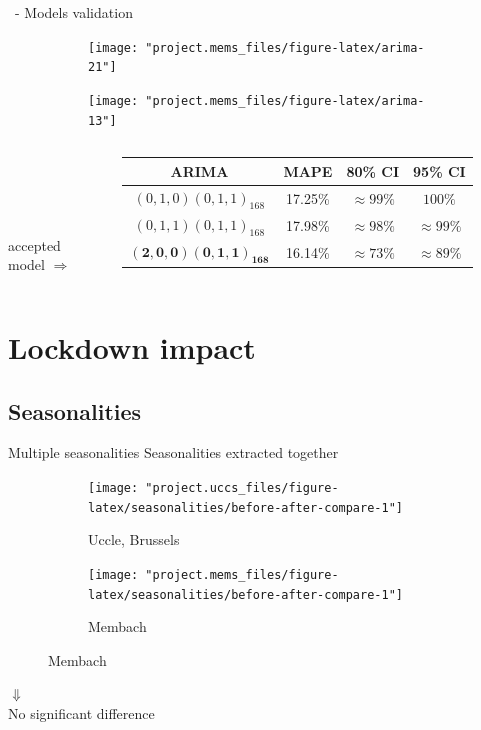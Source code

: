 \documentclass{beamer}
\begin{document}
\begin{frame}{\subsecname~- Models validation}
	\begin{figure}
		\begin{subfigure}{.49\linewidth}
			\texttt{[image: "project.mems\_files/figure-latex/arima-21"]}
		\end{subfigure}
		\begin{subfigure}{.49\linewidth}
			\texttt{[image: "project.mems\_files/figure-latex/arima-13"]}
		\end{subfigure}
	\end{figure}
	\begin{columns}[T]
		\raggedleft~\\~\\~\\~\\\vspace{1em}accepted model $\Rightarrow$ \hspace{-1.5em}
		\begin{table}
			\begin{tabular}{c | c c c}
				\textbf{ARIMA} & MAPE   & 80\% CI & 95\% CI \\
				\midrule
				$(0,1,0)(0,1,1)_{168}$ & 17.25\% & $\approx99\%$ & $100\%$ \\
				$(0,1,1)(0,1,1)_{168}$ & 17.98\% & $\approx98\%$ & $\approx99\%$ \\
				$\mathbf{(2,0,0)(0,1,1)_{168}}$ & 16.14\% & $\approx73\%$ & $\approx89\%$ \\
			\end{tabular}
		\end{table}
	\end{columns}
\end{frame}

\section{Lockdown impact}

\subsection{Seasonalities}

\begin{frame}{Multiple seasonalities}\centering
	Seasonalities extracted together
	\begin{figure}
		\begin{subfigure}{.49\linewidth}
			\texttt{[image: "project.uccs\_files/figure-latex/seasonalities/before-after-compare-1"]}
			\caption{Uccle, Brussels}
		\end{subfigure}
		\begin{subfigure}{.49\linewidth}
			\texttt{[image: "project.mems\_files/figure-latex/seasonalities/before-after-compare-1"]}
			\caption{Membach}
		\end{subfigure}
	\end{figure}
	\large$\Downarrow$\\
	\normalsize No significant difference
\end{frame}
\end{document}
